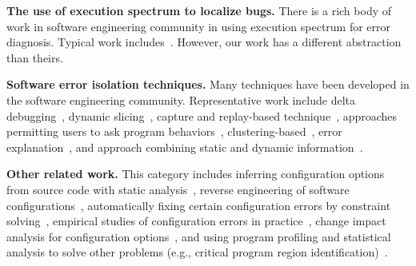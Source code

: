 \textbf{The use of execution spectrum to localize bugs.} There is a rich body of
work in software engineering community in using execution spectrum for error diagnosis.
Typical work includes~\cite{Liblit:2005:SSBI, Santelices:2009:LFU, Reps:1997:UPP,
Yilmaz:2008:TTF}. However, our work has a different abstraction than theirs.

\textbf{Software error isolation techniques.} Many techniques have been developed
in the software engineering community. Representative work include delta debugging~\cite{Zeller:2002:ICC},
dynamic slicing~\cite{Zhang:2006:LFT},
capture and replay-based technique~\cite{Qi:2011:LFE}, approaches permitting
users to ask program behaviors~\cite{Ko:2008:DRA},
clustering-based~\cite{Dickinson:2001:FFC},
error explanation~\cite{Groce:2006:EED},
and approach combining static and dynamic information~\cite{Holmes:2011:IPT, Zhang:2008:EIF}.


\textbf{Other related work.} This category includes inferring configuration options
from source code with static analysis~\cite{Rabkin:2011:SEP}, 
reverse engineering of software configurations~\cite{Wang:2008:TAR}, automatically
fixing certain configuration errors by constraint solving~\cite{rangefix},
empirical studies of configuration errors in practice~\cite{Yin:2011:ESC, Hubaux:2012},
change impact analysis for configuration options~\cite{configimpact},
and using program profiling and statistical analysis to solve
other problems (e.g., critical program region identification)~\cite{Carbin:2010:AIC}.
